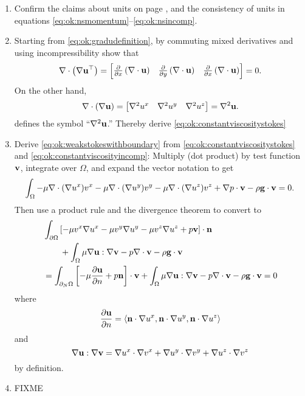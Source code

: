\renewcommand{\labelenumi}{\arabic{chapter}.\arabic{enumi}\quad}
\begin{enumerate}
\item Confirm the claims about units on page \pageref{page:ok:units}, and the consistency of units in equations \eqref{eq:ok:nsmomentum}--\eqref{eq:ok:nsincomp}.

\item \label{exer:ok:constantviscositystokes}  Starting from \eqref{eq:ok:gradudefinition}, by commuting mixed derivatives and using incompressibility show that
\begin{equation*}
\nabla\cdot \left(\nabla \mathbf{u}^{\top}\right) = \begin{bmatrix}
    \frac{\partial}{\partial x}\left(\nabla\cdot \mathbf{u}\right) & \frac{\partial}{\partial y }\left(\nabla\cdot \mathbf{u}\right) & \frac{\partial}{\partial x} \left(\nabla\cdot \mathbf{u}\right)
    \end{bmatrix}
    = 0.
\end{equation*}
On the other hand,
\begin{equation*}
\nabla\cdot \left(\nabla \mathbf{u}\right) = \begin{bmatrix} \nabla^2 u^x & \nabla^2 u^y & \nabla^2 u^z \end{bmatrix} = \nabla^2 \mathbf{u}.
\end{equation*}
defines the symbol ``$\nabla^2 \mathbf{u}$.''  Thereby derive \eqref{eq:ok:constantviscositystokes}

\item \label{exer:ok:weakderive} Derive \eqref{eq:ok:weakstokeswithboundary} from \eqref{eq:ok:constantviscositystokes} and \eqref{eq:ok:constantviscosityincomp}:  Multiply (dot product) by test function $\mathbf{v}$, integrate over $\Omega$, and expand the vector notation to get
    $$\int_\Omega - \mu \nabla\cdot (\nabla u^x) v^x - \mu \nabla\cdot (\nabla u^y) v^y - \mu \nabla\cdot (\nabla u^z) v^z + \nabla p \cdot \mathbf{v} - \rho \mathbf{g} \cdot \mathbf{v} = 0.$$
Then use a product rule and the divergence theorem to convert to
\begin{align*}
   &\int_{\partial \Omega} \left[- \mu v^x \nabla u^x - \mu v^y \nabla u^y - \mu v^z \nabla u^z + p \mathbf{v}\right] \cdot \mathbf{n} \\
   &\qquad  + \int_\Omega \mu \nabla \mathbf{u} : \nabla \mathbf{v} - p \nabla\cdot \mathbf{v} - \rho \mathbf{g} \cdot \mathbf{v} \\
   &= \int_{\partial_N \Omega} \left[- \mu \frac{\partial \mathbf{u}}{\partial n} + p \mathbf{n} \right] \cdot \mathbf{v} + \int_\Omega \mu \nabla \mathbf{u} : \nabla \mathbf{v} - p \nabla\cdot \mathbf{v} - \rho \mathbf{g} \cdot \mathbf{v} = 0
\end{align*}
where
    $$\frac{\partial \mathbf{u}}{\partial n} = \left<\mathbf{n}\cdot \nabla u^x,\mathbf{n}\cdot \nabla u^y,\mathbf{n}\cdot \nabla u^z\right>$$
and
     $$\nabla \mathbf{u} : \nabla \mathbf{v} = \nabla u^x \cdot \nabla v^x + \nabla u^y \cdot \nabla v^y + \nabla u^z \cdot \nabla v^z$$
by definition.

\item \label{exer:ok:smalldetails}  FIXME

\end{enumerate}
